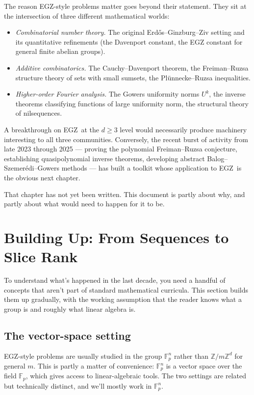 \documentclass[11pt,a4paper]{article}
\theoremstyle{plain}
\theoremstyle{definition}
\theoremstyle{remark}
\newcommand{\F}{\mathbb{F}}
\newcommand{\Z}{\mathbb{Z}}
\newcommand{\EGZ}{\textsf{EGZ}}
\begin{document}
The reason \EGZ-style problems matter goes beyond their statement. They sit at the intersection of three different mathematical worlds:

\begin{itemize}[leftmargin=2em]
  \item \emph{Combinatorial number theory.} The original Erd\H{o}s--Ginzburg--Ziv setting and its quantitative refinements (the Davenport constant, the EGZ constant for general finite abelian groups).
  \item \emph{Additive combinatorics.} The Cauchy--Davenport theorem, the Freiman--Ruzsa structure theory of sets with small sumsets, the Plünnecke--Ruzsa inequalities.
  \item \emph{Higher-order Fourier analysis.} The Gowers uniformity norms $U^k$, the inverse theorems classifying functions of large uniformity norm, the structural theory of nilsequences.
\end{itemize}

A breakthrough on \EGZ\ at the $d \geq 3$ level would necessarily produce machinery interesting to all three communities. Conversely, the recent burst of activity from late 2023 through 2025 --- proving the polynomial Freiman--Ruzsa conjecture, establishing quasipolynomial inverse theorems, developing abstract Balog--Szemer\'edi--Gowers methods --- has built a toolkit whose application to \EGZ\ is the obvious next chapter.

That chapter has not yet been written. This document is partly about why, and partly about what would need to happen for it to be.

\section{Building Up: From Sequences to Slice Rank}

To understand what's happened in the last decade, you need a handful of concepts that aren't part of standard mathematical curricula. This section builds them up gradually, with the working assumption that the reader knows what a group is and roughly what linear algebra is.

\subsection{The vector-space setting}

\EGZ-style problems are usually studied in the group $\F_p^n$ rather than $\Z/m\Z^d$ for general $m$. This is partly a matter of convenience: $\F_p^n$ is a vector space over the field $\F_p$, which gives access to linear-algebraic tools. The two settings are related but technically distinct, and we'll mostly work in $\F_p^n$.
\end{document}
